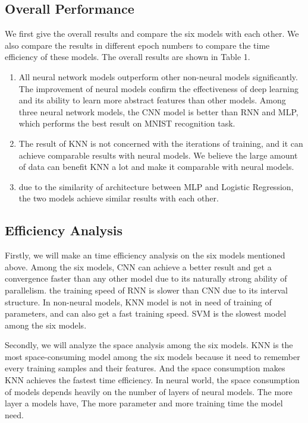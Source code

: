 \documentclass[sigchi]{acmart}
\begin{document}
\subsection{Overall Performance}
We first give the overall results and compare the six models with each other. We also compare the results in different epoch numbers to compare the time efficiency of these models. The overall results are shown in Table 1.




\begin{enumerate}
\item  
All neural network models outperform other non-neural models significantly. The improvement of neural models confirm the effectiveness of deep learning and its ability to learn more abstract features than other models. Among three neural network models, the CNN model  is better than RNN and MLP, which performs the best result on MNIST recognition task.
\item 
The result of KNN is not concerned with the iterations of training, and it can achieve comparable results with neural models. We believe the large amount of data can benefit KNN a lot and make it comparable with neural models. 

\item 
due to the similarity of architecture between MLP and Logistic Regression, the two models  achieve similar results with each other.
\end{enumerate}





\subsection{Efficiency Analysis}

Firstly, we will make an time efficiency analysis on the six models mentioned above. Among the six models, CNN can achieve a better result and get a convergence faster than any other model due to its naturally strong ability of parallelism. the training speed of RNN is slower than CNN due to its interval structure. In non-neural models, KNN model is not in need of training of parameters, and can also get a fast training speed. SVM is the slowest model among the six models.

Secondly, we will analyze the space analysis among the six models. KNN is the most space-consuming model among the six models because it need to remember every training samples and their features. And the space consumption makes KNN achieves the fastest time efficiency. In neural world, the space consumption of models depends heavily on the number of layers of neural models. The more layer a models have, The more parameter and more training time the model need. 











\end{document}
